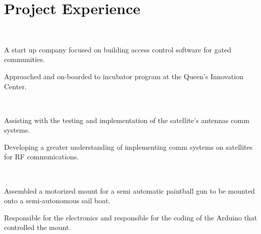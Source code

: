 \documentclass[]{hieudo-build}
\begin{document}
\hfill
\begin{minipage}[t]{0.65\textwidth} 

\section{Project Experience}

 \\
\vspace{\topsep} %
\begin{tightemize}
\item A start up company focused on building access control software for gated communities.
\item Approached and on-boarded to incubator program at the Queen's Innovation Center.
\end{tightemize}
\sectionsep

\\
\begin{tightemize}
\item Assisting with the testing and implementation of the satellite’s antennas comm systems.
\item Developing a greater understanding of implementing comm systems on satellites for RF communications.
\end{tightemize}
\sectionsep

 \\
\begin{tightemize}
\item Assembled a motorized mount for a semi automatic paintball gun to be mounted onto a semi-autonomous sail boat.
\item Responsible for the electronics and responsible for the coding of the Arduino that controlled the mount.
\end{tightemize}
\sectionsep


\end{minipage}
\end{document}

